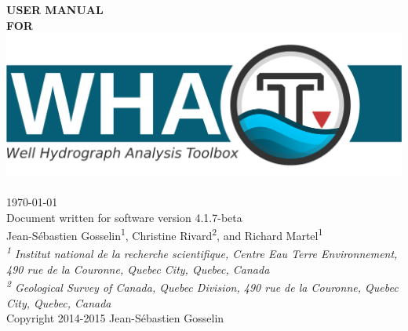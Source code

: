 \documentclass[WHATMANUAL.tex]{subfiles}
\begin{document}

\textbf{\fontsize{72}{900}\selectfont \textcolor[HTML]{333333}{USER MANUAL}}\\[1.5cm]
\textbf{\fontsize{72}{900}\selectfont \textcolor[HTML]{333333}{FOR}}\\


\includegraphics[width=1\textwidth]{WHAT_banner}~\\[2cm]

{\Large \today}\\[0.5cm]
{\Large Document written for software version 4.1.7-beta}\\[2cm]

{\large Jean-S\'ebastien Gosselin\textsuperscript{1}, Christine Rivard\textsuperscript{2}, and Richard Martel\textsuperscript{1}}\\[0.25cm]

\textit{{\small\textsuperscript{1} Institut national de la recherche scientifique, Centre Eau Terre Environnement, 490 rue de la Couronne, Quebec City, Quebec, Canada}}\\[0.1cm]

\textit{{\small\textsuperscript{2} Geological Survey of Canada, Quebec Division, 490 rue de la Couronne, Quebec City, Quebec, Canada}}\\[2cm]

{Copyright 2014-2015 Jean-S\'ebastien Gosselin}
\end{document}

